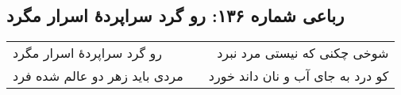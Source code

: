 \begin{center}
\section*{رباعی شماره ۱۳۶: رو گرد سراپردهٔ اسرار مگرد}
\label{sec:sh136}
\begin{longtable}{l p{0.5cm} r}
رو گرد سراپردهٔ اسرار مگرد
&&
شوخی چکنی که نیستی مرد نبرد
\\
مردی باید زهر دو عالم شده فرد
&&
کو درد به جای آب و نان داند خورد
\\
\end{longtable}
\end{center}
